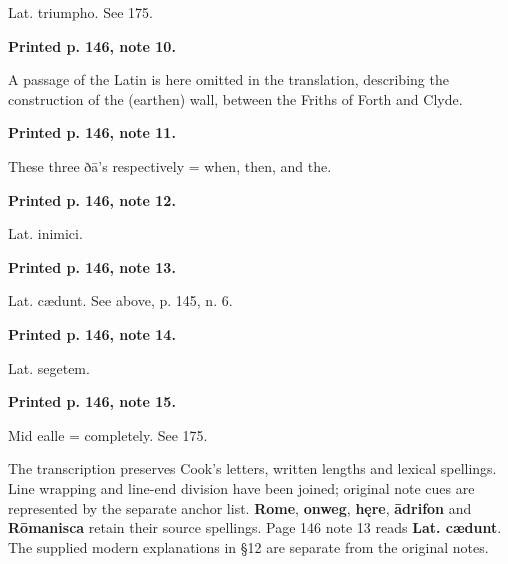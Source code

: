 Lat. triumpho. See 175.

\textbf{Printed p. 146, note 10.}

A passage of the Latin is here omitted in the translation, describing the construction of the (earthen) wall, between the Friths of Forth and Clyde.

\textbf{Printed p. 146, note 11.}

These three ðā’s respectively = when, then, and the.

\textbf{Printed p. 146, note 12.}

Lat. inimici.

\textbf{Printed p. 146, note 13.}

Lat. cædunt. See above, p. 145, n. 6.

\textbf{Printed p. 146, note 14.}

Lat. segetem.

\textbf{Printed p. 146, note 15.}

Mid ealle = completely. See 175.

The transcription preserves Cook’s letters, written lengths and lexical spellings. Line wrapping and line-end division have been joined; original note cues are represented by the separate anchor list. \textbf{Rome}, \textbf{onweg}, \textbf{hęre}, \textbf{ādrifon} and \textbf{Rōmanisca} retain their source spellings. Page 146 note 13 reads \textbf{Lat. cædunt}. The supplied modern explanations in §12 are separate from the original notes.

